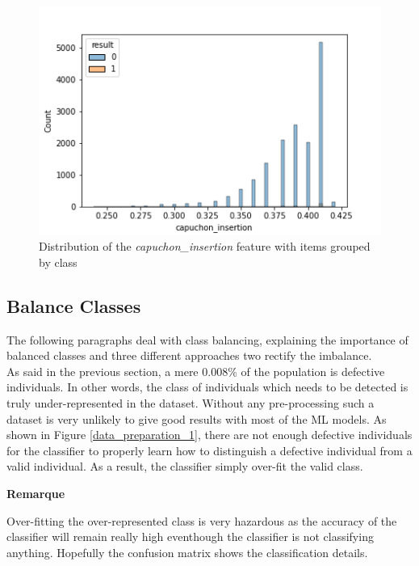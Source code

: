 \begin{figure}
    \center
    \includegraphics[scale=.5]{img/hist_capuchon_insertion.png}
    \caption{Distribution of the \textit{capuchon\_insertion} feature with items grouped by class}
    \label{hist_capuchon}
\end{figure}

\subsection{Balance Classes}
\label{balance_classes}
The following paragraphs deal with class balancing, explaining the importance of balanced classes and three different approaches two rectify the imbalance.\\

As said in the previous section, a mere 0.008\% of the population is defective individuals. In other words, the class of individuals which needs to be detected is truly under-represented in the dataset.
Without any pre-processing such a dataset is very unlikely to give good results with most of the ML models. As shown in Figure \ref{data_preparation_1}, there are not enough defective individuals for the classifier to properly learn how to distinguish a defective individual from a valid individual. As a result, the classifier simply over-fit the valid class.\\

\noindent
\begin{minipage}[!hc]{0.12\textwidth}
   \textbf{Remarque}
\end{minipage}
\vrule\enskip\vrule\quad\begin{minipage}{\dimexpr 0.87\textwidth-0.8pt-1.5em}
Over-fitting the over-represented class is very hazardous as the accuracy of the classifier will remain really high eventhough the classifier is not classifying anything. Hopefully the confusion matrix shows the classification details.
\end{minipage}\\

